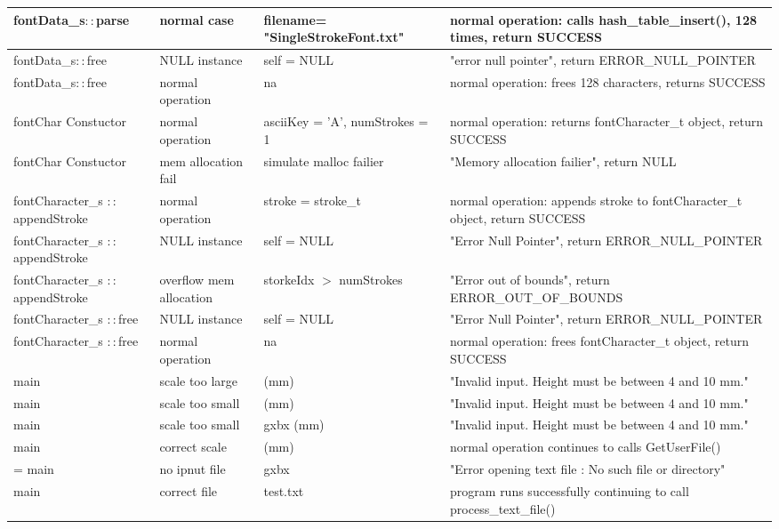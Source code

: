 \begin{longtable}{|>{\raggedright\arraybackslash}m{}|>{\raggedright\arraybackslash}m{}|>{\raggedright\arraybackslash}m{}|>{\raggedright\arraybackslash}m{}|}
        fontData\_s$::$parse & normal case & filename= "SingleStrokeFont.txt" &  normal operation: calls hash\_table\_insert(), 128 times, return SUCCESS \\ \hline
        fontData\_s$::$free & NULL instance & self = NULL &  "error null pointer", return ERROR\_NULL\_POINTER  \\ \hline
        fontData\_s$::$free & normal operation & na &  normal operation: frees 128 characters, returns SUCCESS \\ \hline
        fontChar Constuctor & normal operation & asciiKey = 'A', numStrokes = 1 & normal operation: returns fontCharacter\_t object, return SUCCESS \\ \hline
        fontChar Constuctor & mem allocation fail & simulate malloc failier & "Memory allocation failier", return NULL \\ \hline
        fontCharacter\_s $::$appendStroke & normal operation & stroke = stroke\_t & normal operation: appends stroke to fontCharacter\_t object, return SUCCESS \\ \hline
        fontCharacter\_s $::$appendStroke & NULL instance & self = NULL & "Error Null Pointer", return ERROR\_NULL\_POINTER \\ \hline
        fontCharacter\_s $::$appendStroke & overflow mem allocation & storkeIdx $>$ numStrokes & "Error out of bounds", return ERROR\_OUT\_OF\_BOUNDS \\ \hline
        fontCharacter\_s $::$free & NULL instance & self = NULL & "Error Null Pointer", return ERROR\_NULL\_POINTER \\ \hline
        fontCharacter\_s $::$free & normal operation & na & normal operation: frees fontCharacter\_t object, return SUCCESS \\ \hline
        main & scale too large & 11 (mm) & "Invalid input. Height must be between 4 and 10 mm."\\ \hline
        main & scale too small & 3 (mm) & "Invalid input. Height must be between 4 and 10 mm."\\ \hline
        main & scale too small & gxbx (mm) & "Invalid input. Height must be between 4 and 10 mm."\\ \hline
        main & correct scale & 4 (mm) & normal operation continues to calls GetUserFile()\\ \hline=
        main & no ipnut file & gxbx  & "Error opening text file : No such file or directory"\\ \hline
        main & correct file & test.txt & program runs successfully continuing to call process\_text\_file()\\ \hline

\end{longtable}
